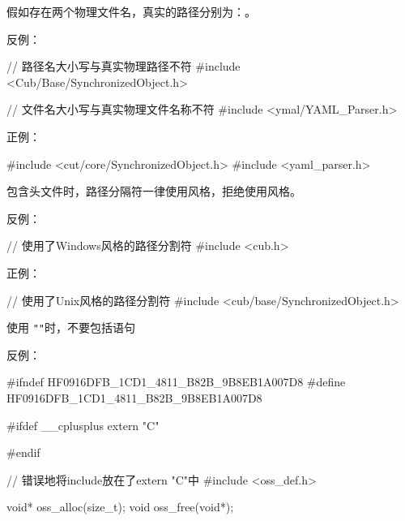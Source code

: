 \begin{content}
假如存在两个物理文件名，真实的路径分别为：。

反例：
\begin{leftbar}
\begin{c++}
// 路径名大小写与真实物理路径不符
#include <Cub/Base/SynchronizedObject.h>

// 文件名大小写与真实物理文件名称不符
#include <ymal/YAML_Parser.h>
\end{c++}
\end{leftbar}

正例：
\begin{leftbar}
\begin{c++}
#include <cut/core/SynchronizedObject.h>
#include <yaml_parser.h>
\end{c++}
\end{leftbar}

\begin{regulation}
包含头文件时，路径分隔符一律使用风格，拒绝使用风格。
\end{regulation}

反例：
\begin{leftbar}
\begin{c++}
// 使用了Windows风格的路径分割符
#include <cub\base\SynchronizedObject.h>
\end{c++}
\end{leftbar}

正例：
\begin{leftbar}
\begin{c++}
// 使用了Unix风格的路径分割符
#include <cub/base/SynchronizedObject.h>
\end{c++}
\end{leftbar}

\begin{regulation}
使用 \texttt{"}\texttt{"}时，不要包括语句
\end{regulation}

反例：
\begin{leftbar}
\begin{c++}[caption={\ttfamily{oss/oss\_memery.h}}]
#ifndef HF0916DFB_1CD1_4811_B82B_9B8EB1A007D8
#define HF0916DFB_1CD1_4811_B82B_9B8EB1A007D8
    
#ifdef  __cplusplus
extern "C" {
#endif

// 错误地将include放在了extern "C"中
#include <oss_def.h>

void* oss_alloc(size_t);
void  oss_free(void*);

}
\end{c++}
\end{leftbar}
\end{content}
